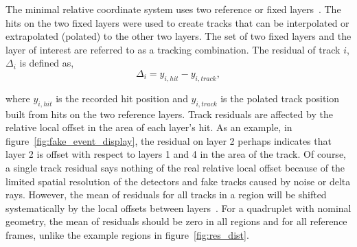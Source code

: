 
The minimal relative coordinate system uses two reference or fixed layers~\cite{lefebvre_thesis}. The hits on the two fixed layers were used to create tracks that can be interpolated or extrapolated (polated) to the other two layers. The set of two fixed layers and the layer of interest are referred to as a tracking combination. The residual of track $i$, $\Delta_i$ is defined as,
\begin{equation}
    \Delta_i = y_{i,hit} - y_{i,track},
    \label{eqn:residual}
\end{equation}

where $y_{i,hit}$ is the recorded hit position and $y_{i,track}$ is the polated track position built from hits on the two reference layers. Track residuals are affected by the relative local offset in the area of each layer's hit. As an example, in figure~\ref{fig:fake_event_display}, the residual on layer 2 perhaps indicates that layer 2 is offset with respect to layers 1 and 4 in the area of the track. Of course, a single track residual says nothing of the real relative local offset because of the limited spatial resolution of the detectors and fake tracks caused by noise or delta rays. However, the mean of residuals for all tracks in a region will be shifted systematically by the local offsets between layers~\cite{lefebvre_thesis}. For a quadruplet with nominal geometry, the mean of residuals should be zero in all regions and for all reference frames, unlike the example regions in figure~\ref{fig:res_dist}.

